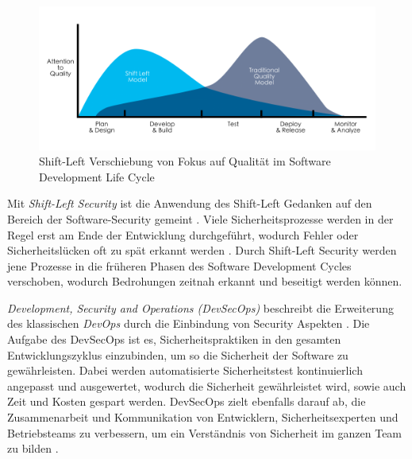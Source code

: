 \begin{figure}
    \centering
    \includegraphics[width=0.9\linewidth]{images/Shift_Left.png}
    \caption{Shift-Left Verschiebung von Fokus auf Qualität im Software Development Life Cycle}
    \label{fig:shiftleft}
  \end{figure}

Mit \textit{Shift-Left Security} ist die Anwendung des Shift-Left Gedanken auf den Bereich der Software-Security gemeint \cite{dawoud_better_2024}. Viele Sicherheitsprozesse werden in der Regel erst am Ende der Entwicklung durchgeführt, wodurch Fehler oder Sicherheitslücken oft zu spät erkannt werden \cite{dawoud_better_2024}. Durch Shift-Left Security werden jene Prozesse in die früheren Phasen des Software Development Cycles verschoben, wodurch Bedrohungen zeitnah erkannt und beseitigt werden können.

\textit{Development, Security and Operations (DevSecOps)} beschreibt die Erweiterung des klassischen \textit{DevOps} durch die Einbindung von Security Aspekten \cite{rajapakse_challenges_2022}. Die Aufgabe des DevSecOps ist es, Sicherheitspraktiken in den gesamten Entwicklungszyklus einzubinden, um so die Sicherheit der Software zu gewährleisten. Dabei werden automatisierte Sicherheitstest kontinuierlich angepasst und ausgewertet, wodurch die Sicherheit gewährleistet wird, sowie auch Zeit und Kosten gespart werden. DevSecOps zielt ebenfalls darauf ab, die Zusammenarbeit und Kommunikation von Entwicklern, Sicherheitsexperten und Betriebsteams zu verbessern, um ein Verständnis von Sicherheit im ganzen Team zu bilden \cite{rajapakse_challenges_2022}.


